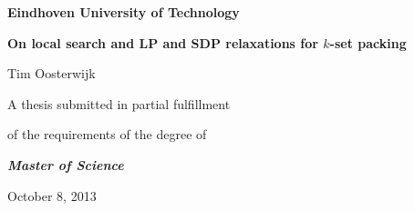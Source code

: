 \begin{titlepage}
    \let\footnotesize\small
    \let\footnoterule\relax
    \let \footnote \thanks
    \setcounter{footnote}{0}
    \null\vfil
    \begin{center}
      \setlength{\parskip}{0pt}
      {\large\textbf{Eindhoven University of Technology}\par}
      \vfill
      {\huge \bf On local search and LP and SDP relaxations for $k$-set packing \par}
      \vfill
      {\LARGE Tim Oosterwijk \par}
      \vfill
      {\large A thesis submitted in partial fulfillment\par}
      {\large of the requirements of the degree of\par}
      \bigskip
      {\large \emph{\textbf{Master of Science}} \par}
      \bigskip
      \bigskip
      \bigskip
      {\Large October 8, 2013 \par}
      \bigskip
    \end{center}
    \par
    \vfil\null
  \end{titlepage} 